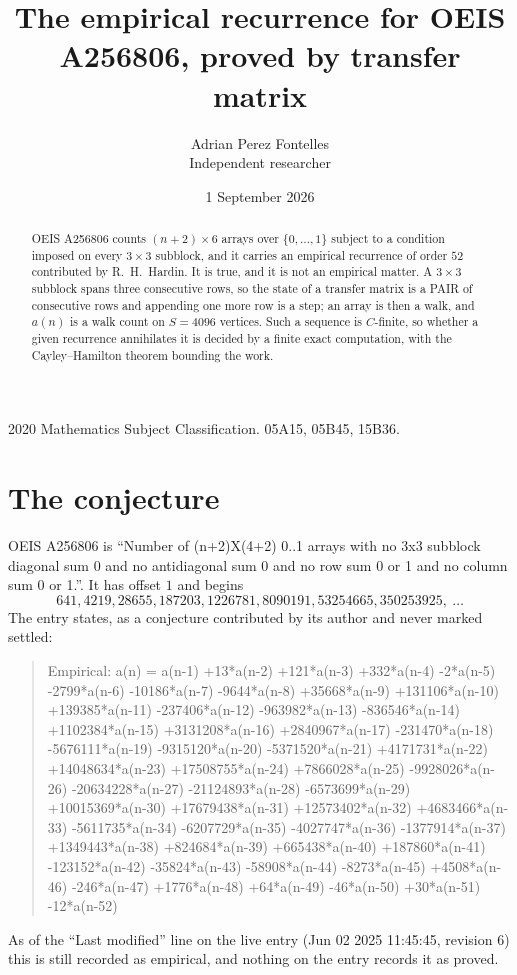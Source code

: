 \documentclass[11pt,a4paper]{article}
\title{The empirical recurrence for OEIS A256806, proved by transfer matrix}
\author{Adrian Perez Fontelles\\ \small Independent researcher}
\date{1 September 2026}
\theoremstyle{plain}
\theoremstyle{definition}
\begin{document}
\maketitle

\begin{abstract}
OEIS A256806 counts $(n+2)\times6$ arrays over $\{0,\dots,1\}$ subject to a condition imposed on
every $3\times3$ subblock, and it carries an empirical recurrence of order $52$
contributed by R.~H.~Hardin. It is true, and it is not an empirical matter. A $3\times3$
subblock spans three consecutive rows, so the state of a transfer matrix is a PAIR of
consecutive rows and appending one more row is a step; an array is then a walk, and
$a(n)$ is a walk count on $S=4096$ vertices. Such a sequence is $C$-finite, so whether a given
recurrence annihilates it is decided by a finite exact computation, with the Cayley--Hamilton
theorem bounding the work.
\end{abstract}

\noindent\small 2020 Mathematics Subject Classification. 05A15, 05B45, 15B36.\normalsize

\section{The conjecture}

OEIS A256806 is ``Number of (n+2)X(4+2) 0..1 arrays with no 3x3 subblock diagonal sum 0 and no antidiagonal sum 0 and no row sum 0 or 1 and no column sum 0 or 1.''. It has offset $1$ and begins
\[
641, 4219, 28655, 187203, 1226781, 8090191, 53254665, 350253925,\ \dots
\]
The entry states, as a conjecture contributed by its author and never marked settled:
\begin{quote}
Empirical: a(n) = a(n-1) +13*a(n-2) +121*a(n-3) +332*a(n-4) -2*a(n-5) -2799*a(n-6) -10186*a(n-7) -9644*a(n-8) +35668*a(n-9) +131106*a(n-10) +139385*a(n-11) -237406*a(n-12) -963982*a(n-13) -836546*a(n-14) +1102384*a(n-15) +3131208*a(n-16) +2840967*a(n-17) -231470*a(n-18) -5676111*a(n-19) -9315120*a(n-20) -5371520*a(n-21) +4171731*a(n-22) +14048634*a(n-23) +17508755*a(n-24) +7866028*a(n-25) -9928026*a(n-26) -20634228*a(n-27) -21124893*a(n-28) -6573699*a(n-29) +10015369*a(n-30) +17679438*a(n-31) +12573402*a(n-32) +4683466*a(n-33) -5611735*a(n-34) -6207729*a(n-35) -4027747*a(n-36) -1377914*a(n-37) +1349443*a(n-38) +824684*a(n-39) +665438*a(n-40) +187860*a(n-41) -123152*a(n-42) -35824*a(n-43) -58908*a(n-44) -8273*a(n-45) +4508*a(n-46) -246*a(n-47) +1776*a(n-48) +64*a(n-49) -46*a(n-50) +30*a(n-51) -12*a(n-52)
\end{quote}
As of the ``Last modified'' line on the live entry (Jun 02 2025 11:45:45, revision 6) this is still
recorded as empirical, and nothing on the entry records it as proved.
\end{document}
